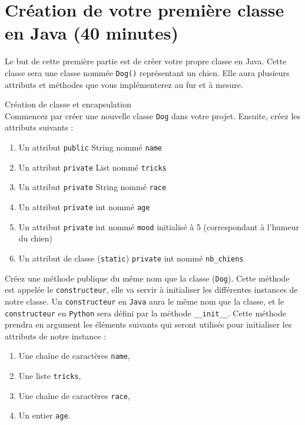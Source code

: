 \section{Création de votre première classe en Java (40 minutes)}

Le but de cette première partie est de créer votre propre classe en Java. Cette classe sera une classe nommée \lstinline{Dog()} représentant un chien. Elle aura plusieurs attributs et méthodes que vous implémenterez au fur et à mesure.
\\

\begin{Exercice}[10 minutes] Création de classe et encapsulation\\
    Commencez par créer une nouvelle classe \lstinline{Dog} dans votre projet. Ensuite, créez les attributs suivants :
    \begin{enumerate}
    \item Un attribut \lstinline{public} String nommé \lstinline{name}
    \item Un attribut \lstinline{private} List nommé \lstinline{tricks}
    \item Un attribut \lstinline{private} String nommé \lstinline{race}
    \item Un attribut \lstinline{private} int nommé \lstinline{age}
    \item Un attribut \lstinline{private} int nommé \lstinline{mood} initialisé à 5 (correspondant à l'humeur du chien)
    \item Un attribut de classe (\lstinline{static}) \lstinline{private} int nommé \lstinline{nb_chiens}
   	\end{enumerate}
   	
   	Créez une méthode publique du même nom que la classe (\lstinline{Dog}). Cette méthode est appelée le \lstinline{constructeur}, elle va servir à initialiser les différentes instances de notre classe. Un \lstinline{constructeur} en \lstinline{Java} aura le même nom que la classe, et le \lstinline{constructeur} en \lstinline{Python} sera défini par la méthode \lstinline{__init__}. Cette méthode prendra en argument les éléments suivants qui seront utilisés pour initialiser les attributs de notre instance :
   	\begin{enumerate}
    \item Une chaîne de caractères \lstinline{name},
    \item Une liste \lstinline{tricks},
    \item Une chaîne de caractères \lstinline{race},
    \item Un entier \lstinline{age}.
   	\end{enumerate}
   	

\end{Exercice}
